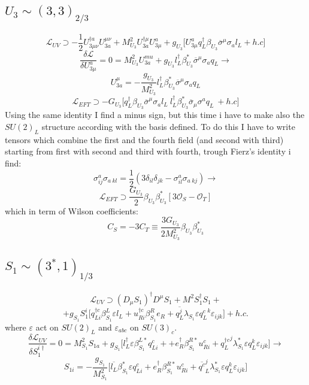 \documentclass{article}
\begin{document}
\subsection{$U_3 \sim (3,3)_{2/3}$}
\[
\mathcal{L}_{UV} \supset -\frac{1}{2} U^{\dagger a}_{3\mu \nu} U_{3a}^{\mu \nu} + M^2_{U_3} U_{3a}^{\dagger\mu} U^a_{3 \mu} + g_{U_3}\big[ U_{3 \mu}^a q_L^\dagger \beta_{U_3} \overline{\sigma}^\mu \sigma_a l_L + h.c \big] 
\]
\[
\frac{\delta \mathcal{L}}{\delta U_{3 \mu}^a} =0 = M_{U_3}^2 U_{3a}^{mu} +g_{U_3} l_L^\dagger \beta^*_{U_3} \overline{\sigma}^\mu \sigma_a q_L \rightarrow
\]
\[
U^\mu_{3a} = -\frac{g_{U_3}}{M^2_{U_3}} l_L^\dagger \beta^*_{U_3} \overline{\sigma}^\mu \sigma_a q_L 
\]
\[
\mathcal{L}_{EFT} \supset -G_{U_3} \big[ q_L^\dagger \beta_{U_3} \overline{\sigma}^\mu \sigma_a l_L \ l_L^\dagger \beta^*_{U_3} \overline{\sigma}_\mu \sigma^a q_L \ + h.c \big]
\]
Using the same identity I find a minus sign, but this time i have to make also the $SU(2)_L$ structure according with the basis defined. To do this I have to write tensors which combine the first and the fourth field (and second with third) starting from first with second and third with fourth, trough Fierz's identity i find:
\[
\sigma^a_{ij} \sigma_{a \ kl} = \frac{1}{2} (3\delta_{il} \delta_{jk} - \sigma^a_{il} \sigma_{a \ kj}) \rightarrow
\]
\[
\mathcal{L}_{EFT} \supset \frac{G_{U_3}}{2} \beta_{U_3} \beta_{U_3}^*[3 \mathcal{O}_S - \mathcal{O}_T]
\]
which in term of Wilson coefficients:
\[
C_S = -3 C_T \equiv \frac{3 G_{U_3}}{2 M^2_{U_3}} \beta_{U_3} \beta_{U_3}^*
\]


\subsection{$S_1 \sim (3^*,1)_{1/3}$}
\[
\mathcal{L}_{UV} \supset (D_\mu S_1)^\dagger D^\mu S_1 + M^2 S_1^\dagger S_1 +
\]
\[
+g_{S_1} S_1^i \big[ q^{\dagger c}_{L i} \beta^L_{S_1} \varepsilon l_L + u^{\dagger c}_{R i} \beta^R_{S_1}  e_R + \overline{q^j_L} \lambda_{S_1} \varepsilon {q^{c}_L}^k \varepsilon_{ijk} \big] +h.c.
\]
where $\varepsilon$ act on $SU(2)_L$ and $\varepsilon_{abc} $ on $SU(3)_c$.
\[
\frac{\delta \mathcal{L}_{UV}}{\delta S_1^{i \dagger}} =0= M^2_{S_1} S_{1a} + g_{S_1}\big[ l_L^\dagger \varepsilon \beta^{L*}_{S_1}  q^c_{L i} + + e^\dagger_{R } \beta^{R*}_{S_1}  u^c_{R i} + {q^{\dagger c}_L}^j \lambda_{S_1}^* \varepsilon q^k_L \varepsilon_{ijk}\big] \rightarrow
\]  
\[
S_{1i} = - \frac{g_{S_1}}{M^2_{S_1}} \big[ \overline{l_L} \beta^*_{S_1} \varepsilon q^c_{L i} +  e^\dagger_{R } \beta^{R*}_{S_1} u^c_{R i} + \overline{q^c}_L^j \lambda_{S_1}^* \varepsilon q^k_L \varepsilon_{ijk}\big] 
\]
\end{document}
